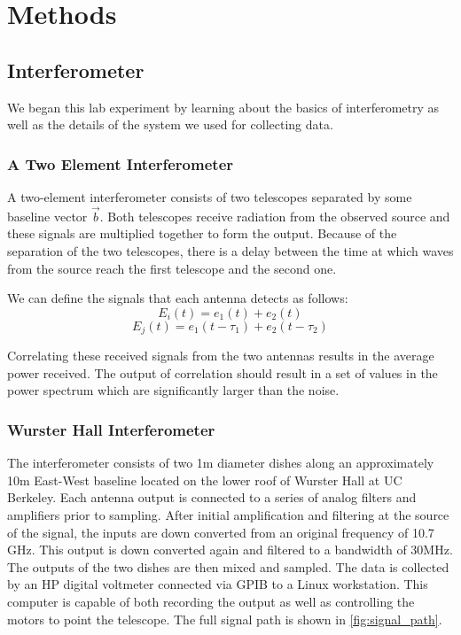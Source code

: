 \documentclass{article}
\begin{document}
\section{Methods}
  \subsection{Interferometer}
  We began this lab experiment by learning about the basics of interferometry as
  well as the details of the system we used for collecting data.

  \subsubsection{A Two Element Interferometer}
  A two-element interferometer consists of two telescopes separated by some
  baseline vector $\vec{b}$. Both telescopes receive radiation from the observed
  source and these signals are multiplied together to form the output. Because
  of the separation of the two telescopes, there is a delay between the time at
  which waves from the source reach the first telescope and the second one.

  We can define the signals that each antenna detects as follows:
  \[E_{i}(t) = e_{1}(t) + e_{2}(t)\]
  \[E_{j}(t) = e_{1}(t-\tau_{1}) + e_{2}(t-\tau_{2})\]

  Correlating these received signals from the two antennas results in the
  average power received. The output of correlation should result in a set of
  values in the power spectrum which are significantly larger than the noise.

  \subsubsection{Wurster Hall Interferometer}
  The interferometer consists of two 1m diameter dishes along an approximately
  10m East-West baseline located on the lower roof of Wurster Hall at UC
  Berkeley. Each antenna output is connected to a series of analog
  filters and amplifiers prior to sampling.  After initial amplification and
  filtering at the source of the signal, the inputs are down converted from an
  original frequency of 10.7 GHz. This output is down converted again and
  filtered to a bandwidth of 30MHz. The outputs of the two dishes are then mixed
  and sampled.  The data is collected by an HP digital voltmeter connected via
  GPIB to a Linux workstation. This computer is capable of both recording the
  output as well as controlling the motors to point the telescope. The full
  signal path is shown in \ref{fig:signal_path}.
\end{document}
